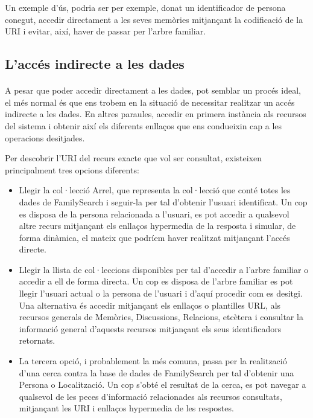         Un exemple d'ús, podria ser per exemple, donat un identificador de persona conegut, accedir directament a les seves memòries mitjançant la codificació de la URI i evitar, així, haver de passar per l'arbre familiar.


    \subsection{L'accés indirecte a les dades}

        \paragraph{}
        A pesar que poder accedir directament a les dades, pot semblar un procés ideal, el més normal és que ens trobem en la situació de necessitar realitzar un accés indirecte a les dades. En altres paraules, accedir en primera instància als recursos del sistema i obtenir així els diferents enllaços que ens condueixin cap a les operacions desitjades.

        Per descobrir l’URI del recurs exacte que vol ser consultat, existeixen principalment tres opcions diferents:

        \begin{itemize}
            \item Llegir la col·lecció Arrel, que representa la col·lecció que conté totes les dades de FamilySearch i seguir-la per tal d'obtenir l'usuari identificat. Un cop es disposa de la persona relacionada a l'usuari, es pot accedir a qualsevol altre recurs mitjançant els enllaços hypermedia de la resposta i simular, de forma dinàmica, el mateix que podríem haver realitzat mitjançant l'accés directe.
            \item Llegir la llista de col·leccions disponibles per tal d'accedir a l'arbre familiar o accedir a ell de forma directa. Un cop es disposa de l'arbre familiar es pot llegir l'usuari actual o la persona de l'usuari i d'aquí procedir com es desitgi. Una alternativa és accedir mitjançant els enllaços o plantilles URL, als recursos generals de Memòries, Discussions, Relacions, etcètera i consultar la informació general d'aquests recursos mitjançant els seus identificadors retornats.
            \item La tercera opció, i probablement la més comuna, passa per la realització d'una cerca contra la base de dades de FamilySearch per tal d'obtenir una Persona o Localització. Un cop s'obté el resultat de la cerca, es pot navegar a qualsevol de les peces d'informació relacionades als recursos consultats, mitjançant les URI i enllaços hypermedia de les respostes.
        \end{itemize}

